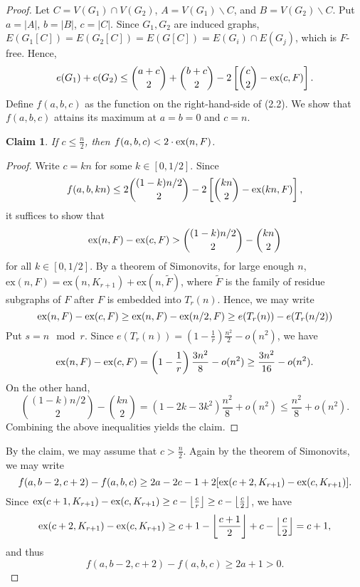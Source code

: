 \documentclass[12pt]{report}
\newtheorem{claim}{Claim}[theorem]
\begin{document}
\begin{proof}
  Let $C = V(G_1) \cap V(G_2)$, $A = V(G_1) \backslash C$, and $B = V(G_2) \backslash C$. Put $a =
  |A|$, $b = |B|$, $c = |C|$. Since $G_1, G_2$ are induced graphs, $E(G_1[C]) =
  E(G_2[C]) = E(G[C]) = E(G_i) \cap E(G_j)$, which is $F$-free. Hence, 
  \begin{gather}
    e(G_1) + e(G_2) \leq \binom{a + c}{2} +  \binom{b + c}{2} - 2\left[\binom{c}{2} - \textnormal{ex}(c, F)\right].
  \end{gather}
  Define $f(a, b, c)$ as the function on the right-hand-side of (2.2). We show that $f(a, b, c)$
  attains its maximum at $a = b = 0$ and $c = n$. 

  \begin{claim}
    If $c \leq \frac{n}{2}$, then $f(a, b, c) < 2 \cdot \textnormal{ex}(n, F)$.
  \end{claim}

  \begin{proof}
    Write $c = kn$ for some $k \in [0, 1/2]$. Since
    \[
      f(a, b, kn) \leq 2\binom{(1 - k)n/2}{2} - 2\left[\binom{kn}{2} - \textnormal{ex}(kn, F)\right],
    \]
    it suffices to show that
    \[
      \textnormal{ex}(n, F) - \textnormal{ex}(c, F) > \binom{(1 - k)n/2}{2} - \binom{kn}{2}
    \]
    for all $k \in [0, 1/2]$. By a theorem of Simonovits, for large enough $n$, $\text{ex}(n, F) =
    \text{ex}(n, K_{r + 1}) + \text{ex}(n, \tilde{F})$, where $\tilde{F}$ is the family of residue
    subgraphs of $F$ after $F$ is embedded into $T_r(n)$. Hence, we may write
    \[
      \textnormal{ex}(n, F) - \textnormal{ex}(c, F) \geq \textnormal{ex}(n, F) - \textnormal{ex}(n/2, F) \geq e(T_r(n)) - e(T_r(n/2))
    \]
    Put $s = n \mod r$. Since $e(T_r(n)) = \left(1 - \frac{1}{r}\right)\frac{n^2}{2} - o(n^2)$, we
    have
    \[
      \textnormal{ex}(n, F) - \textnormal{ex}(c, F) = \left(1 - \frac{1}{r}\right)\frac{3n^2}{8} - o(n^2) \geq \frac{3n^2}{16} - o(n^2).
    \]
    On the other hand, 
    \[
      \binom{(1 - k)n/2}{2} - \binom{kn}{2} = (1 - 2k - 3k^2)\frac{n^2}{8} + o(n^2) \leq \frac{n^2}{8} + o(n^2).
    \]
    Combining the above inequalities yields the claim.
  \end{proof}
  By the claim, we may assume that $c > \frac{n}{2}$. Again by the theorem of Simonovits, we may
  write
  \[
    f(a, b - 2, c + 2) - f(a, b, c) \geq 2a - 2c - 1 + 2[\textnormal{ex}(c + 2, K_{r + 1}) - \textnormal{ex}(c, K_{r + 1})].
  \]
  Since $\textnormal{ex}(c + 1, K_{r + 1}) - \textnormal{ex}(c, K_{r + 1}) \geq c - \left\lfloor
  \frac{c}{r} \right\rfloor \geq c - \left\lfloor \frac{c}{2} \right\rfloor$, we have
  \[
    \textnormal{ex}(c + 2, K_{r + 1}) - \textnormal{ex}(c, K_{r + 1}) \geq c + 1 - \left\lfloor \frac{c + 1}{2} \right\rfloor + c - \left\lfloor \frac{c}{2} \right\rfloor = c + 1,
  \]
  and thus 
  \[
    f(a, b - 2, c + 2) - f(a, b, c) \geq 2a + 1 > 0.
  \]


\end{proof}
\end{document}
